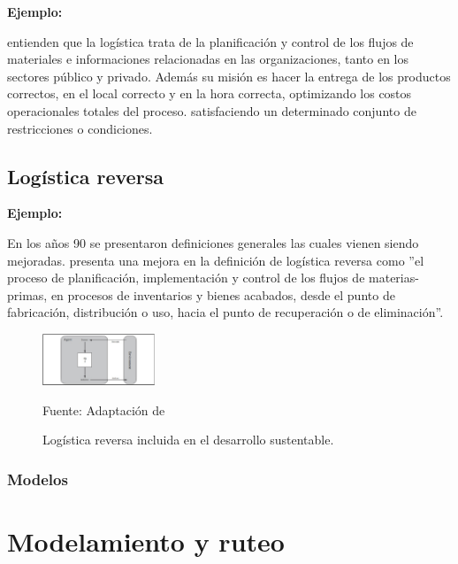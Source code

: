 {\bf Ejemplo:}\par

\cite{Ghiani} entienden que la logística trata de la planificación y control de los flujos de materiales e informaciones relacionadas en las organizaciones, tanto en los sectores público y privado. Además su misión es hacer la entrega de los productos correctos, en el local correcto y en la hora correcta, optimizando los costos operacionales totales del proceso.
satisfaciendo un determinado conjunto de restricciones o condiciones.\par

\subsection{Logística reversa}

{\bf Ejemplo:}\par

En los años 90 se presentaron definiciones generales las cuales vienen siendo mejoradas. \cite{Dekker} presenta una mejora en la definición de logística reversa como  ”el proceso de planificación, implementación y control de los flujos de materias-primas, en procesos de inventarios y bienes acabados, desde el punto de fabricación, distribución o uso, hacia el punto de recuperación o de eliminación”. 
\begin{figure}[ht]
\begin{center}
\includegraphics[width=0.3\textwidth]{Figura1}
\end{center}
\begin{center}
\vskip -0.5cm
\caption{\small{Logística reversa incluida en el desarrollo sustentable.}}
{\small{Fuente: Adaptación de \cite{Tanguay}}}
\end{center}
\end{figure}


\subsubsection{Modelos}

\section{Modelamiento y ruteo }

